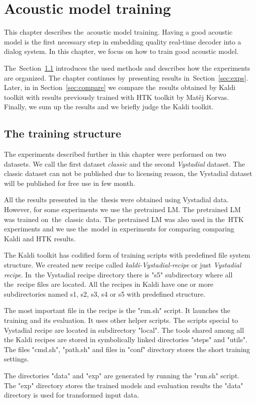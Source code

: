 \chapter{Acoustic model training}
\label{cha:training}

This chapter describes the~acoustic model training.
Having a good acoustic model is the first necessary step in embedding 
quality real-time decoder into a dialog system.
In this chapter, we focus on how to train good acoustic model.

The~Section~\ref{sec:setup} introduces the used methods and describes 
how the experiments are organized. The chapter continues by~presenting results in~Section~\ref{sec:exps}. 
Later, in in Section~\ref{sec:compare} we compare the~results obtained by Kaldi toolkit with results
previously trained with \ac{HTK} toolkit by Matěj Korvas.
Finally, we sum up the results and we briefly judge the Kaldi toolkit.

\section{The training structure} 
\label{sec:setup}

The experiments described further in this chapter were performed on two datasets.
We call the first dataset {\it classic}\/ and the second {\it Vystadial}\/ dataset.
The classic dataset can not be published due to licensing reason, 
the Vystadial dataset will be published for free use in few month.

All the results presented in the~thesis were obtained using Vystadial data.
However, for some experiments we use the pretrained \ac{LM}.
The pretrained \acl{LM} was trained on~the~classic data.
The pretrained \ac{LM} was also used in the~\ac{HTK} experiments and we use the~model in experiments for comparing 
comparing Kaldi and \ac{HTK} results.

\small{The Kaldi toolkit has codified form of training scripts with predefined file system structure. 
We created new recipe called {\it kaldi-Vystadial-recipe}\/ or just {\it Vystadial recipe}. 
In~the Vystadial recipe directory there is "s5" subdirectory where all the~recipe files are located. 
All the recipes in Kaldi have one or more subdirectories named s1, s2, s3, s4 or s5 with predefined structure.

The most important file in the recipe is the "run.sh" script. It launches the training and its evaluation.
It uses other helper scripts. The scripts special to Vystadial recipe are located in subdirectory "local".
The tools shared among all the Kaldi recipes are stored in symbolically linked directories "steps" and "utils".
The files "cmd.sh", "path.sh" and files in "conf" directory stores the short training settings.

The directories "data" and "exp" are generated by running the "run.sh" script.
The "exp" directory stores the trained models and evaluation results the "data" 
directory is used for transformed input data.}

